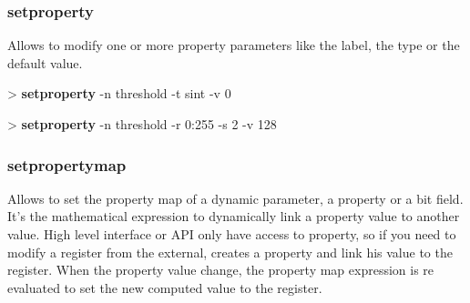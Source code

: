 \documentclass[10pt,a4paper]{article}
\begin{document}
{

\subsubsection{setproperty}
\label{subsec:setproperty}

Allows to modify one or more property parameters like the label, the type or the default value.\\


\begin{sampletitle}[1]
> \textbf{\tool{} setproperty} -n threshold -t sint -v 0
\end{sampletitle}

\begin{sampletitle}[2]
> \textbf{\tool{} setproperty} -n threshold -r 0:255 -s 2 -v 128
\end{sampletitle}

\subsubsection{setpropertymap}
\label{subsec:setpropertymap}

Allows to set the property map of a dynamic parameter, a property or a bit field. It's the mathematical expression to dynamically link a property value to another value. High level interface or API only have access to property, so if you need to modify a register from the external, creates a property and link his value to the register. When the property value change, the property map expression is re evaluated to set the new computed value to the register.\\

}
\end{document}
